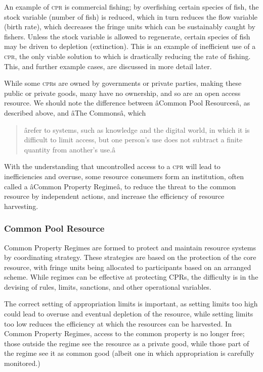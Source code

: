 An example of \textsc{cpr} is commercial fishing; by overfishing certain species of fish, the stock variable (number of fish) is reduced, which in turn reduces the flow variable (birth rate), which decreases the fringe units which can be sustainably caught by fishers. Unless the stock variable is allowed to regenerate, certain species of fish may be driven to depletion (extinction). This is an example of inefficient use of a \textsc{cpr}, the only viable solution to which is drastically reducing the rate of fishing. This, and further example cases, are discussed in more detail later.

While some \textsc{cpr}s are owned by governments or private parties, making these public or private goods, many have no ownership, and so are an open access resource. We should note the difference between âCommon Pool Resourcesâ, as described above, and âThe Commonsâ, which

\begin{quote}
	ârefer to systems, such as knowledge and the digital world, in which it is difficult to limit access, but one person's use does not subtract a finite quantity from another's use.â~\cite{Ostrom-challenge-90}
\end{quote}

With the understanding that uncontrolled access to a \textsc{cpr} will lead to inefficiencies and overuse, some resource consumers form an institution, often called a âCommon Property Regimeâ, to reduce the threat to the common resource by independent actions, and increase the efficiency of resource harvesting.

\subsubsection{Common Pool Resource}

Common Property Regimes are formed to protect and maintain resource systems by coordinating strategy. These strategies are based on the protection of the core resource, with fringe units being allocated to participants based on an arranged scheme. While regimes can be effective at protecting \textsc{CPR}s, the difficulty is in the devising of rules, limits, sanctions, and other operational variables.

The correct setting of appropriation limits is important, as setting limits too high could lead to overuse and eventual depletion of the resource, while setting limits too low reduces the efficiency at which the resources can be harvested. In Common Property Regimes, access to the common property is no longer free; those outside the regime see the resource as a private good, while those part of the regime see it as common good (albeit one in which appropriation is carefully monitored.)

